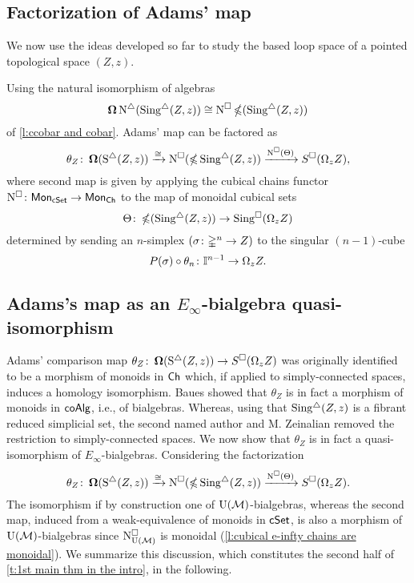 \subsection{Factorization of Adams' map} \label{factorization}

We now use the ideas developed so far to study the based loop space of a pointed topological space $(Z, z)$.

Using the natural isomorphism of algebras
\begin{equation*}
\operatorname{\mathbf{\Omega}} \operatorname{N^{\triangle}} (\operatorname{Sing^{\triangle}}(Z, z)) \cong  \operatorname{N^{\square}} \operatorname{\mathbb{\Omega}} (\operatorname{Sing^{\triangle}}(Z, z))
\end{equation*}
of \cref{l:ccobar and cobar}.
Adams' map can be factored as 
\begin{equation*}
\theta_Z \colon \operatorname{\mathbf{\Omega}}(\operatorname{S^{\triangle}}(Z, z)) \xrightarrow{\cong} 
\operatorname{N^{\square}}(\operatorname{\mathbb{\Omega}} \operatorname{Sing^{\triangle}}(Z, z)) \xrightarrow{\operatorname{N^{\square}}(\Theta)} 
S^{\square}(\Omega_z Z),
\end{equation*}
where second map is given by applying the cubical chains functor $\operatorname{N^{\square}} \colon \mathsf{Mon}_{\mathsf{cSet}} \to \mathsf{Mon}_{\mathsf{Ch}}$ to the map of monoidal cubical sets
\begin{equation*}
\Theta \colon \operatorname{\mathbb{\Omega}}(\operatorname{Sing^{\triangle}}(Z, z)) \to \operatorname{Sing^{\square}}(\Omega_z Z)
\end{equation*}
determined by sending an $n$-simplex $(\sigma \colon \mathbb{\Delta}^n \to Z)$ to the singular $(n-1)$-cube
\begin{equation*}
P(\sigma) \circ \theta_n \colon \mathbb{I}^{n-1} \to \Omega_z Z.
\end{equation*}


\subsection{Adams's map as an $E_{\infty}$-bialgebra quasi-isomorphism}

Adams' comparison map $\theta_Z \colon \operatorname{\mathbf{\Omega}}(\operatorname{S^{\triangle}}(Z, z)) \to S^{\square}(\Omega_z Z)$ was originally identified to be a morphism of monoids in $\mathsf{Ch}$ which, if applied to simply-connected spaces, induces a homology isomorphism.
Baues showed that $\theta_Z$ is in fact a morphism of monoids in $\mathsf{coAlg}$, i.e., of bialgebras.
Whereas, using that $\operatorname{Sing^{\triangle}}(Z, z)$ is a fibrant reduced simplicial set, the second named author and M. Zeinalian \cite{rivera2018cubical} removed the restriction to simply-connected spaces.
We now show that $\theta_Z$ is in fact a quasi-isomorphism of $E_{\infty}$-bialgebras.
Considering the factorization
\begin{equation*}
\theta_Z \colon \operatorname{\mathbf{\Omega}}(\operatorname{S^{\triangle}}(Z, z)) \xrightarrow{\cong} 
\operatorname{N^{\square}}(\operatorname{\mathbb{\Omega}} \operatorname{Sing^{\triangle}}(Z, z)) \xrightarrow{\operatorname{N^{\square}}(\Theta)} 
S^{\square}(\Omega_z Z).
\end{equation*}
The isomorphism if by construction one of ${\operatorname{U}(\mathcal{M})}$-bialgebras, whereas the second map, induced from a weak-equivalence of monoids in $\mathsf{cSet}$, is also a morphism of ${\operatorname{U}(\mathcal{M})}$-bialgebras
since $\operatorname{N^{\square}_{{\operatorname{U}(\mathcal{M})}}}$ is monoidal (\cref{l:cubical e-infty chains are monoidal}).
We summarize this discussion, which constitutes the second half of \cref{t:1st main thm in the intro}, in the following.

